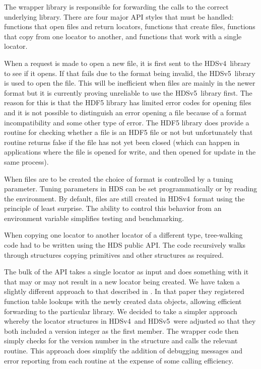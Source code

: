 \documentclass[final,authoryear,5p,times,twocolumn]{elsarticle}
\newcommand{\new}{HDSv5}
\newcommand{\old}{HDSv4}
\begin{document}
The wrapper library is responsible for forwarding the calls to the
correct underlying library. There are four major API styles that must
be handled: functions that open files and return locators, functions
that create files, functions that copy from one locator to another,
and functions that work with a single locator.

When a request is made to open a new file, it is first sent to the
\old\ library to see if it opens. If that fails due to the format
being invalid, the \new\ library is used to open the file. This will be
inefficient when files are mainly in the newer format but it is
currently proving unreliable to use the \new\ library first. The
reason for this is that the HDF5 library has limited error codes for
opening files and it is not possible to distinguish an error opening a
file because of a format incompatibility and some other type of
error. The HDF5 library does provide a routine for checking whether a
file is an HDF5 file or not but unfortunately that routine returns
false if the file has not yet been closed (which can happen in
applications where the file is opened for write, and then opened for
update in the same process).

When files are to be created the choice of format is controlled by a
tuning parameter. Tuning parameters in HDS can be set programmatically
or by reading the environment. By default, files are still created in
\old\ format using the principle of least surprise. The ability to
control this behavior from an environment variable simplifies testing
and benchmarking.

When copying one locator to another locator of a different type,
tree-walking code had to be written using the HDS public API. The code
recursively walks through structures copying primitives and other
structures as required.

The bulk of the API takes a single locator as input and does something
with it that may or may not result in a new locator being created. We
have taken a slightly different approach to that described in
\citet{2004Rew}. In that paper they registered function table lookups
with the newly created data objects, allowing efficient forwarding to
the particular library. We decided to take a simpler approach whereby
the locator structures in \old\ and \new\ were adjusted so that they
both included a version integer as the first member. The wrapper code
then simply checks for the version number in the structure and calls the
relevant routine. This approach does simplify the addition of
debugging messages and error reporting from each routine at the
expense of some calling efficiency.
\end{document}
